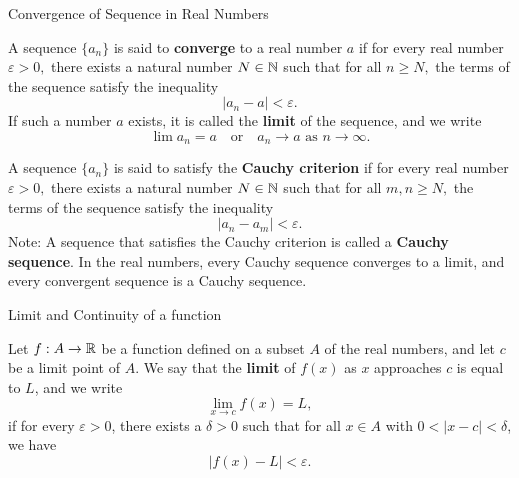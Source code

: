 \documentclass[12pt, a4paper]{article}
\begin{document}
\FrontPage
\Large

\begin{heading}
    Convergence of Sequence in Real Numbers
\end{heading}

\vspace{10pt}


\begin{definition}
	A sequence $\{a_n\}$ is said to \textbf{converge} to a real number $a$ if for every real number $\varepsilon > 0,$ there exists a natural number $N \in \mathbb{N}$ such that for all $n \geq N,$ the terms of the sequence satisfy the inequality 
	\[
	|a_n - a| < \varepsilon.
	\]
	If such a number $a$ exists, it is called the \textbf{limit} of the sequence, and we write
	\[
	\lim a_n = a \quad \text{or} \quad a_n \to a \text{ as } n \to \infty.
	\]
\end{definition}

\vspace{30pt}

\begin{definition}
    A sequence $\{a_n\}$ is said to satisfy the \textbf{Cauchy criterion} if for every real number $\varepsilon > 0,$ there exists a natural number $N \in \mathbb{N}$ such that for all $m, n \geq N,$ the terms of the sequence satisfy the inequality 
    \[
    |a_n - a_m| < \varepsilon.
    \]
    Note: A sequence that satisfies the Cauchy criterion is called a \textbf{Cauchy sequence}. In the real numbers, every Cauchy sequence converges to a limit, and every convergent sequence is a Cauchy sequence.
\end{definition}

\clearpage

\begin{heading}
    Limit and Continuity of a function
\end{heading}

\vspace{10pt}

\begin{definition}
    Let $f:A\to\mathbb{R}$ be a function defined on a subset $A$ of the real numbers, and let $c$ be a limit point of $A$. We say that the \textbf{limit} of $f(x)$ as $x$ approaches $c$ is equal to $L$, and we write
\[
\lim_{x \to c} f(x) = L,
\]
if for every $\varepsilon > 0$, there exists a $\delta > 0$ such that for all $x \in A$ with $0 < |x - c| < \delta$, we have
\[
|f(x) - L| < \varepsilon.
\]
\end{definition}
\end{document}
